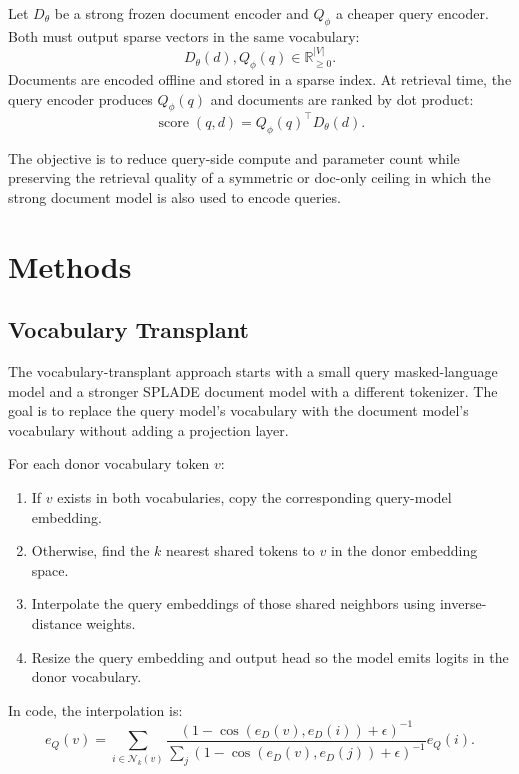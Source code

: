 \documentclass[
]{ceurart}
\begin{document}
Let $D_\theta$ be a strong frozen document encoder and $Q_\phi$ a cheaper query
encoder. Both must output sparse vectors in the same vocabulary:
\begin{equation}
  D_\theta(d), Q_\phi(q) \in \mathbb{R}^{|V|}_{\ge 0}.
\end{equation}
Documents are encoded offline and stored in a sparse index. At retrieval time,
the query encoder produces $Q_\phi(q)$ and documents are ranked by dot product:
\begin{equation}
  \operatorname{score}(q,d) = Q_\phi(q)^\top D_\theta(d).
\end{equation}

The objective is to reduce query-side compute and parameter count while
preserving the retrieval quality of a symmetric or doc-only ceiling in which
the strong document model is also used to encode queries.

\section{Methods}

\subsection{Vocabulary Transplant}

The vocabulary-transplant approach starts with a small query masked-language
model and a stronger SPLADE document model with a different tokenizer. The goal
is to replace the query model's vocabulary with the document model's vocabulary
without adding a projection layer.

For each donor vocabulary token $v$:
\begin{enumerate}
  \item If $v$ exists in both vocabularies, copy the corresponding query-model
  embedding.
  \item Otherwise, find the $k$ nearest shared tokens to $v$ in the donor
  embedding space.
  \item Interpolate the query embeddings of those shared neighbors using
  inverse-distance weights.
  \item Resize the query embedding and output head so the model emits logits in
  the donor vocabulary.
\end{enumerate}

In code, the interpolation is:
\begin{equation}
  e_Q(v) = \sum_{i \in \mathcal{N}_k(v)}
  \frac{(1 - \cos(e_D(v), e_D(i)) + \epsilon)^{-1}}
       {\sum_j (1 - \cos(e_D(v), e_D(j)) + \epsilon)^{-1}}
  e_Q(i).
\end{equation}
\end{document}
